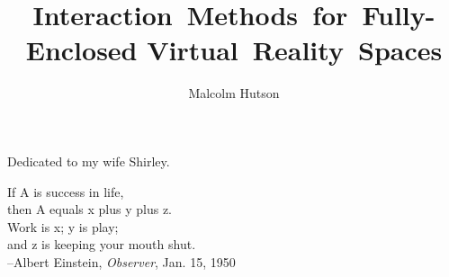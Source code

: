 \documentclass[12pt]{report}	%
\author{Malcolm Hutson}
\title{Interaction~Methods~for~Fully-Enclosed Virtual~Reality~Spaces}
\begin{document}
\titlepage              %

\copyrightpage          %

\approvalpage           %



%
\begin{dedication}
Dedicated to my wife Shirley.
\end{dedication}

\begin{epigraph}
If A is success in life,\\
then A equals x plus y plus z.\\
Work is x; y is play;\\
and z is keeping your mouth shut.\\
--Albert Einstein, \emph{Observer}, Jan. 15, 1950
\end{epigraph}
\end{document}
